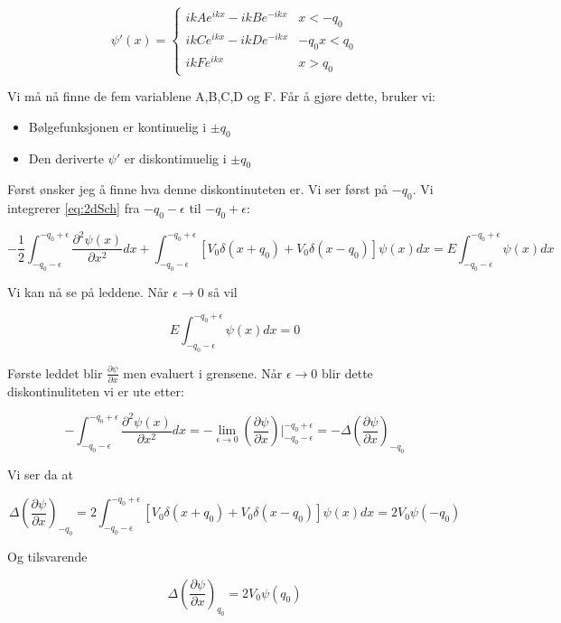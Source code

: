 \documentclass[a4paper,norsk, 10pt]{article}
\numberwithin{equation}{section}
\begin{document}
\begin{equation}
\psi'(x) = 
\begin{cases}
ikAe^{ikx} - ikBe^{-ikx} & x< -q_0 \\
ikCe^{ikx} -ikDe^{-ikx} & -q_0x< q_0 \\
ikFe^{ikx} & x>q_0 
\end{cases}
\label{eq:psiDer}
\end{equation}

Vi må nå finne de fem variablene A,B,C,D og F. Får å gjøre dette, bruker vi:

\begin{itemize}
\item Bølgefunksjonen er kontinuelig i $\pm q_0$
\item Den deriverte $\psi'$ er diskontimuelig i $\pm q_0$
\end{itemize}

Først ønsker jeg å finne hva denne diskontinuteten er. Vi ser først på $-q_0$. Vi integrerer \ref{eq:2dSch} fra $-q_0 - \epsilon$ til $-q_0 + \epsilon$:

$$
-\frac{1}{2}\int_{-q_0 - \epsilon}^{-q_0 + \epsilon}\frac{\partial^2 \psi(x)}{\partial x^2}dx + \int_{-q_0 - \epsilon}^{-q_0 + \epsilon}\left[V_0\delta(x+q_0) + V_0\delta(x-q_0)\right]\psi(x)dx = E\int_{-q_0 - \epsilon}^{-q_0 + \epsilon}\psi(x) dx
$$

Vi kan nå se på leddene. Når $\epsilon \rightarrow 0$ så vil 

$$E\int_{-q_0 - \epsilon}^{-q_0 + \epsilon}\psi(x) dx = 0$$

Første leddet blir $\frac{\partial \psi}{\partial x}$ men evaluert i grensene. Når $\epsilon \rightarrow 0$ blir dette diskontinuliteten vi er ute etter:

$$
-\int_{-q_0 - \epsilon}^{-q_0 + \epsilon}\frac{\partial^2 \psi(x)}{\partial x^2}dx = -\lim_{\epsilon \rightarrow 0}\left(\frac{\partial \psi}{\partial x}\right)\bigg|_{-q_0 - \epsilon}^{-q_0 + \epsilon} = -\Delta \left(\frac{\partial \psi}{\partial x}\right)_{-q_0}
$$

Vi ser da at

\begin{equation}
\Delta \left(\frac{\partial \psi}{\partial x}\right)_{-q_0} = 2\int_{-q_0 - \epsilon}^{-q_0 + \epsilon}\left[V_0\delta(x+q_0) + V_0\delta(x-q_0)\right]\psi(x)dx = 2V_0\psi(-q_0)
\label{eq:deltapsi-q0}
\end{equation}

Og tilsvarende

\begin{equation}
\Delta \left(\frac{\partial \psi}{\partial x}\right)_{q_0} = 2V_0\psi(q_0)
\end{equation}
\end{document}
